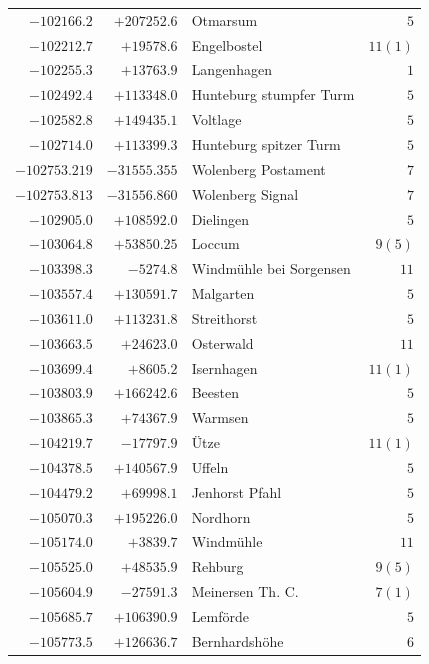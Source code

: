 \begin{center}
\begin{tabular}{r|r|p{170pt}|r}
\(-102166.2\)&\(+207252.6\)&Otmarsum&\(5\)\\
\(-102212.7\)&\(+19578.6\)&Engelbostel&\(11 (1)\)\\
\(-102255.3\)&\(+13763.9\)&Langenhagen&\(1\)\\
\(-102492.4\)&\(+113348.0\)&Hunteburg stumpfer Turm&\(5\)\\
\(-102582.8\)&\(+149435.1\)&Voltlage&\(5\)\\
\(-102714.0\)&\(+113399.3\)&Hunteburg spitzer Turm&\(5\)\\
\(-102753.219\)&\(-31555.355\)&Wolenberg Postament&\(7\)\\
\(-102753.813\)&\(-31556.860\)&Wolenberg Signal&\(7\)\\
\(-102905.0\)&\(+108592.0\)&Dielingen&\(5\)\\
\(-103064.8\)&\(+53850.25\)&Loccum&\(9 (5)\)\\
\(-103398.3\)&\(-5274.8\)&Windmühle bei Sorgensen&\(11\)\\
\(-103557.4\)&\(+130591.7\)&Malgarten&\(5\)\\
\(-103611.0\)&\(+113231.8\)&Streithorst&\(5\)\\
\(-103663.5\)&\(+24623.0\)&Osterwald&\(11\)\\
\(-103699.4\)&\(+8605.2\)&Isernhagen&\(11 (1)\)\\
\(-103803.9\)&\(+166242.6\)&Beesten&\(5\)\\
\(-103865.3\)&\(+74367.9\)&Warmsen&\(5\)\\
\(-104219.7\)&\(-17797.9\)&Ütze&\(11 (1)\)\\
\(-104378.5\)&\(+140567.9\)&Uffeln&\(5\)\\
\(-104479.2\)&\(+69998.1\)&Jenhorst Pfahl&\(5\)\\
\(-105070.3\)&\(+195226.0\)&Nordhorn&\(5\)\\
\(-105174.0\)&\(+3839.7\)&Windmühle&\(11\)\\
\(-105525.0\)&\(+48535.9\)&Rehburg&\(9 (5)\)\\
\(-105604.9\)&\(-27591.3\)&Meinersen Th. C.&\(7 (1)\)\\
\(-105685.7\)&\(+106390.9\)&Lemförde&\(5\)\\
\(-105773.5\)&\(+126636.7\)&Bernhardshöhe&\(6\)\\
\hline\end{tabular}\endgroup\end{center}
\clearpage
